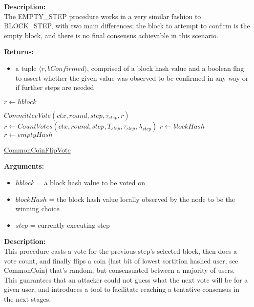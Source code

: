 \documentclass[10pt,a4paper]{article}
\begin{document}
\noindent \textbf{Description:}\\
The EMPTY\_STEP procedure works in a very similar fashion to BLOCK\_STEP, with two main differences: 
the block to attempt to confirm is the empty block, and there is no final consensus achievable in this scenario.

\noindent \textbf{Returns:}
\begin{itemize}
    \item a tuple $\langle r, bConfirmed \rangle$, comprised of a block hash value and a boolean flag to assert whether the given value was
    observed to be confirmed in any way or if further steps are needed
  \end{itemize}

\begin{algorithm}
    \begin{algorithmic}[H]
        \State $r \gets hblock$
    
        \State $CommitteeVote(ctx, round, step, \tau_{step}, r)$
        \State $r \gets CountVotes(ctx,round,step,T_{step},\tau_{step},\lambda_{step})$
                \State $r \gets blockHash$
            \Else
                \State $r \gets emptyHash$
            \EndIf
        \EndIf
    \EndFunction
    \end{algorithmic}
    \caption{\underline{CommonCoinFlipVote}}
\end{algorithm}

\noindent \textbf{Arguments:}
\begin{itemize}
    \item $hblock$ = a block hash value to be voted on
    \item $blockHash$ = the block hash value locally observed by the node to be the winning choice
    \item $step$ = currently executing step
  \end{itemize}

\noindent \textbf{Description:}\\
This procedure casts a vote for the previous step's selected block, then does a vote count,
and finally flips a coin (last bit of lowest sortition hashed user, see CommonCoin) that's random,
but consensuated between a majority of users. This guarantees that an attacker could not guess what the
next vote will be for a given user, and introduces a tool to facilitate reaching a tentative consensus in the next stages.
\end{document}
